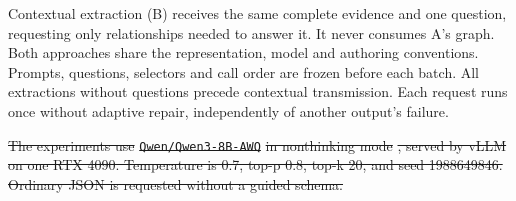 \documentclass[a4paper,twoside]{article}
\newcommand{\Temperature}{0.7}
\newcommand{\TopP}{0.8}
\newcommand{\TopK}{20}
\newcommand{\Seed}{1988649846}
\providecommand{\DIFdeltex}[1]{{\protect\color{red}\sout{#1}}}                      %
\providecommand{\DIFdelbegin}{} %
\providecommand{\DIFdel}[1]{\texorpdfstring{\DIFdeltex{#1}}{}} %
\begin{document}
Contextual extraction (B) receives the same complete evidence and one question, requesting only relationships needed to answer it. It never consumes A's graph. Both approaches share the representation, model and authoring conventions. Prompts, questions, selectors and call order are frozen before each batch. All extractions without questions precede contextual transmission. Each request runs once without adaptive repair, independently of another output's failure.





\DIFdelbegin \DIFdel{The experiments use }\texttt{\DIFdel{Qwen/Qwen3-8B-AWQ}} %
\DIFdel{in nonthinking mode }%
\DIFdel{, served by vLLM }%
\DIFdel{on one RTX 4090. Temperature is \Temperature, top-p \TopP, top-k \TopK, and seed \Seed.  Ordinary JSON is requested without a guided schema. 
}%
\end{document}
